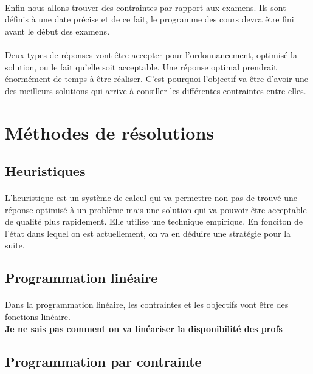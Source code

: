 \documentclass[12pt]{article}
\begin{document}
		\paragraph{}
			Enfin nous allons trouver des contraintes par rapport aux examens. Ils sont définis à une date précise et de ce fait, le programme des cours devra être fini avant le début des examens.

		\paragraph{}
			Deux types de réponses vont être accepter pour l'ordonnancement, optimisé la solution, ou le fait qu'elle soit acceptable. Une réponse optimal prendrait énormément de temps à être réaliser. C'est pourquoi l'objectif va être d'avoir une des meilleurs solutions qui arrive à consiller les différentes contraintes entre elles.

	\section{Méthodes de résolutions}
		\subsection{Heuristiques}
			
			\paragraph{}
				L'heuristique est un système de calcul qui va permettre non pas de trouvé une réponse optimisé à un problème mais une solution qui va pouvoir être acceptable de qualité plus rapidement. Elle utilise une technique empirique. En fonciton de l'état dans lequel on est actuellement, on va en déduire une stratégie pour la suite.

		\subsection{Programmation linéaire}
			\paragraph{}
				Dans la programmation linéaire, les contraintes et les objectifs vont être des fonctions linéaire.\\
\textbf{Je ne sais pas comment on va linéariser la disponibilité des profs}

		\subsection{Programmation par contrainte}
\end{document}
